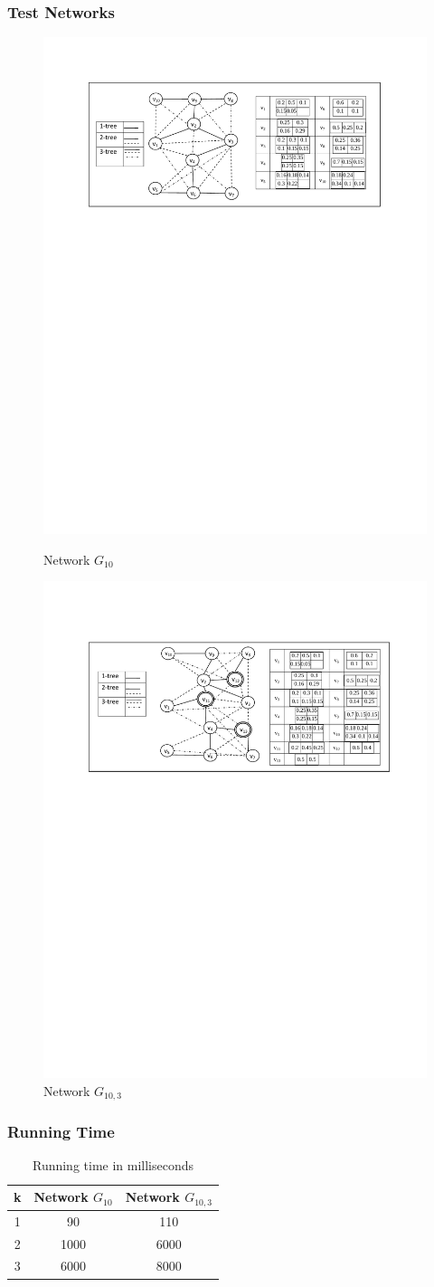 \documentclass{beamer}
\begin{document}
\begin{frame}
\frametitle{Test Networks}
\vspace{-0.5em}
\begin{figure}[!htb]
\begin{minipage}{.8\linewidth}
\includegraphics[width=4 in, height=1.2 in]{NetworkI_paper.pdf}
\caption{Network $G_{10}$}
\label{fig:netI1}
\end{minipage}
\begin{minipage}{.8\linewidth}
\includegraphics[width=4 in, height=1.2 in]{NetworkI_paper_Relay.pdf}
\vspace{-0.7 cm}
\caption{Network $G_{10,3}$}
\label{fig:netIR}
\end{minipage}
\end{figure}

\end{frame}

\begin{frame}
\frametitle{Running Time}
\begin{table}[!htb]
    \begin{minipage}{1\linewidth}
   
      \centering
     \begin{tabular}{|c|c|c|}
     \hline
         k& Network $G_{10}$ &Network $G_{10,3}$\\
     \hline
     1&90& 110 \\\hline
     2&1000 &6000	\\\hline
3 &6000&8000	 \\\hline
\end{tabular}
 \caption{Running time in milliseconds}
\label{Tab:rtym1}
    \end{minipage}
\end{table}

\end{frame}
\end{document}
